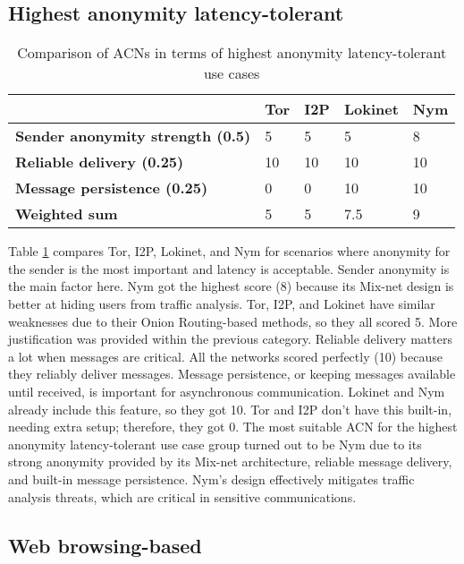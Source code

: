 \subsection{Highest anonymity latency-tolerant}

\begin{table}[!ht]
\caption{Comparison of ACNs in terms of highest anonymity latency-tolerant use cases}
\label{tab:high_latency_uc}
\small
\begin{tabular}{|p{}|p{}|p{}|p{}|p{}|}
\hline
\textbf{} & \textbf{Tor} & \textbf{I2P} & \textbf{Lokinet} & \textbf{Nym} \\
\hline
\textbf{Sender anonymity strength (0.5)} & 5 & 5 & 5 & 8 \\
\hline
\textbf{Reliable delivery (0.25)} & 10 & 10 & 10 & 10 \\
\hline
\textbf{Message persistence (0.25)} & 0 & 0 & 10 & 10 \\
\hline
\textbf{Weighted sum} & 5 & 5 & 7.5 & 9 \\
\hline
\end{tabular}
\end{table}

Table \ref{tab:high_latency_uc} compares Tor, I2P, Lokinet, and Nym for scenarios where anonymity for the sender is the most important and latency is acceptable.
Sender anonymity is the main factor here. Nym got the highest score (8) because its Mix-net design is better at hiding users from traffic analysis. Tor, I2P, and Lokinet have similar weaknesses due to their Onion Routing-based methods, so they all scored 5. More justification was provided within the previous category.
Reliable delivery matters a lot when messages are critical. All the networks scored perfectly (10) because they reliably deliver messages.
Message persistence, or keeping messages available until received, is important for asynchronous communication. Lokinet and Nym already include this feature, so they got 10. Tor and I2P don't have this built-in, needing extra setup; therefore, they got 0.
The most suitable ACN for the highest anonymity latency-tolerant use case group turned out to be Nym due to its strong anonymity provided by its Mix-net architecture, reliable message delivery, and built-in message persistence. Nym’s design effectively mitigates traffic analysis threats, which are critical in sensitive communications.

\subsection{Web browsing-based}

